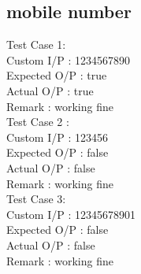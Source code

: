 \documentclass[conference]{IEEEtran}
\begin{document}
\subsection{ mobile number}
Test Case 1:\\
Custom I/P : 1234567890\\
Expected O/P : true\\
Actual O/P : true\\
Remark : working fine\\
Test Case 2 :\\
Custom I/P : 123456\\
Expected O/P : false\\
Actual O/P : false\\
Remark : working fine\\
Test Case 3:\\
Custom I/P : 12345678901\\
Expected O/P : false\\
Actual O/P : false\\
Remark : working fine\\
\end{document}
